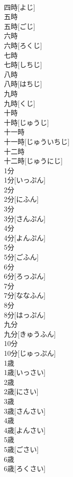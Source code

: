 \documentclass[8pt]{extreport}
\begin{document}
\begin{CJK}{UTF8}{min}
\\	四時[よじ]		
\\	五時	
\\	五時[ごじ]		
\\	六時	
\\	六時[ろくじ]		
\\	七時	
\\	七時[しちじ]		
\\	八時	
\\	八時[はちじ]		
\\	九時	
\\	九時[くじ]		
\\	十時	
\\	十時[じゅうじ]		
\\	十一時	
\\	十一時[じゅういちじ]		
\\	十二時	
\\	十二時[じゅうにじ]		
\\	1分	
\\	1分[いっぷん]		
\\	2分	
\\	2分[にふん]		
\\	3分	
\\	3分[さんぷん]		
\\	4分	
\\	4分[よんぷん]		
\\	5分	
\\	5分[ごふん]		
\\	6分	
\\	6分[ろっぷん]		
\\	7分	
\\	7分[ななふん]		
\\	8分	
\\	8分[はっぷん]		
\\	九分	
\\	九分[きゅうふん]		
\\	10分	
\\	10分[じゅっぷん]		
\\	1歳	
\\	1歳[いっさい]		
\\	2歳	
\\	2歳[にさい]		
\\	3歳	
\\	3歳[さんさい]		
\\	4歳	
\\	4歳[よんさい]		
\\	5歳	
\\	5歳[ごさい]		
\\	6歳	
\\	6歳[ろくさい]		

\end{CJK}
\end{document}
